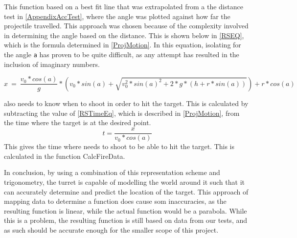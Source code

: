 This function based on a best fit line that was extrapolated from a the distance
test in \autoref{AppendixAccTest}, where the angle was plotted against how far
the projectile travelled. This approach was chosen because of the complexity
involved in determining the angle based on the distance. This is shown below in
\autoref{RSEQ}, which is the formula determined in \autoref{ProjMotion}. In this
equation, isolating for the angle \texttt{a} has proven to be quite difficult,
as any attempt has resulted in the inclusion of imaginary numbers.
  
\begin{equation}\label{RSEQ}
x\ =\ \frac{v_0*cos(a)}{g}* \left(
v_0*sin(a)+\sqrt{v_0^2*sin(a)^2+2*g*(h+r*sin(a))}\right)+r*cos(a)
\end{equation}

\name also needs to know when to shoot in order to hit the target.
This is calculated by subtracting the value of \autoref{RSTimeEq}, which is described in
\autoref{ProjMotion}, from the time where the target is at the desired point.
\begin{equation}\label{RSTimeEq}
t=\frac{x}{v_0*cos(a)}
\end{equation}
This gives the time where \name needs to shoot to be able to hit the target.
This is calculated in the function CalcFireData.\nl

In conclusion, by using a combination of this representation scheme and
trigonometry, the turret is capable of modelling the world around it such that
it can accurately determine and predict the location of the target. This
approach of mapping data to determine a function does cause som inaccuracies, as
the resulting function is linear, while the actual function would be a parabola.
While this is a problem, the resulting function is still based on data from our
tests, and as such should be accurate enough for the smaller scope of this
project.
